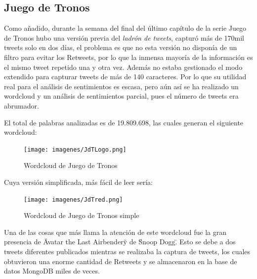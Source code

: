 \subsection{Juego de Tronos}

Como añadido, durante la semana del final del último capítulo de la serie Juego de Tronos hubo una versión previa del \textit{ladrón de tweets}, capturó más de 170mil tweets solo en dos días, el problema es que no esta versión no disponía de un filtro para evitar los Retweets, por lo que la inmensa mayoría de la información es el mismo tweet repetido una y otra vez. Además no estaba gestionado el modo extendido para capturar tweets de más de 140 caracteres. Por lo que su utilidad real para el análisis de sentimientos es escasa, pero aún así se ha realizado un wordcloud y un análisis de sentimientos parcial, pues el número de tweets era abrumador. 



El total de palabras analizadas es de 19.809.698, las cuales generan el siguiente wordcloud:

\begin{figure}[H]
	\centering
	\texttt{[image: imagenes/JdTLogo.png]}
	\caption{Wordcloud de Juego de Tronos}
	\label{fig:wordcloudJdT}
\end{figure} 


Cuya versión simplificada, más fácil de leer sería: 
\begin{figure}[H]
	\centering
	\texttt{[image: imagenes/JdTred.png]}
	\caption{Wordcloud de Juego de Tronos simple}
	\label{fig:wordcloudJdT}
\end{figure} 

Una de las cosas que más llama la atención de este wordcloud fue la gran presencia de \"Avatar the Last Airbender\" y de \"Snoop Dogg\". Esto se debe a dos tweets diferentes publicados mientras se realizaba la captura de tweets, los cuales obtuvieron una enorme cantidad de Retweets y se almacenaron en la base de datos MongoDB miles de veces. 


